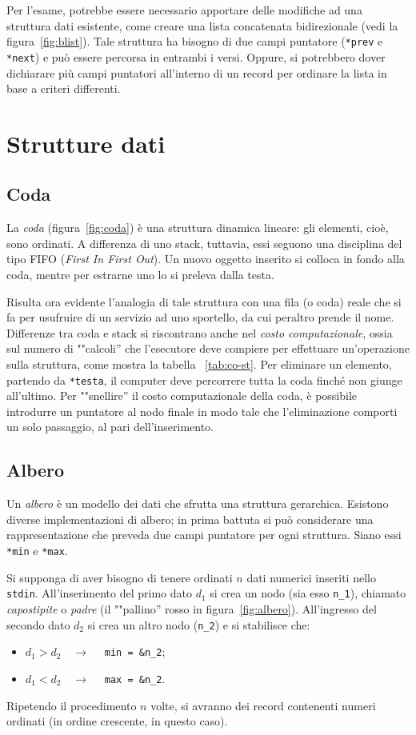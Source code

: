 Per l'esame, potrebbe essere necessario apportare delle modifiche ad una struttura dati esistente, come creare una lista concatenata bidirezionale (vedi la figura~\vref{fig:blist}). Tale struttura ha bisogno di due campi puntatore (\lstinline!*prev! e \lstinline!*next!) e può essere percorsa in entrambi i versi. Oppure, si potrebbero dover dichiarare più campi puntatori all'interno di un record per ordinare la lista in base a criteri differenti.

	\section{Strutture dati}
		\subsection{Coda}
		\label{subsec:coda}
La \emph{coda} (figura~\vref{fig:coda}) è una struttura dinamica lineare: gli elementi, cioè, sono ordinati. A differenza di uno stack, tuttavia, essi seguono una disciplina del tipo FIFO (\emph{First In First Out}). Un nuovo oggetto inserito si colloca in fondo alla coda, mentre per estrarne uno lo si preleva dalla testa.

Risulta ora evidente l'analogia di tale struttura con una fila (o coda) reale che si fa per usufruire di un servizio ad uno sportello, da cui peraltro prende il nome. Differenze tra coda e stack si riscontrano anche nel \emph{costo computazionale}, ossia sul numero di ""calcoli'' che l'esecutore deve compiere per effettuare un'operazione sulla struttura, come mostra la tabella ~\vref{tab:co-st}. Per eliminare un elemento, partendo da \lstinline!*testa!, il computer deve percorrere tutta la coda finché non giunge all'ultimo. Per ""snellire'' il costo computazionale della coda, è possibile introdurre un puntatore al nodo finale in modo tale che l'eliminazione comporti un solo passaggio, al pari dell'inserimento.

		\subsection{Albero}
		\label{subsec:albero}
Un \emph{albero} è un modello dei dati che sfrutta una struttura gerarchica. Esistono diverse implementazioni di albero; in prima battuta si può considerare una rappresentazione che preveda due campi puntatore per ogni struttura. Siano essi \lstinline!*min! e \lstinline!*max!.

Si supponga di aver bisogno di tenere ordinati $n$ dati numerici inseriti nello \lstinline!stdin!. All'inserimento del primo dato $d_1$ si crea un nodo (sia esso \lstinline!n_1!), chiamato \emph{capostipite} o \emph{padre} (il ""pallino'' rosso in figura~\vref{fig:albero}). All'ingresso del secondo dato $d_2$ si crea un altro nodo (\lstinline!n_2!) e si stabilisce che:
\begin{itemize}
	\item
$d_1>d_2 \quad \rightarrow \quad $ \lstinline!min = &n_2!;
	\item
$d_1<d_2 \quad \rightarrow \quad $ \lstinline!max = &n_2!.
\end{itemize}
Ripetendo il procedimento $n$ volte, si avranno dei record contenenti numeri ordinati (in ordine crescente, in questo caso).

